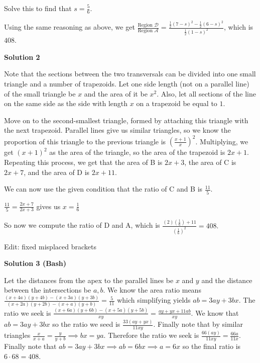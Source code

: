 \begin{enumerate}
 Solve this to find that $s = \frac{5}{6}$.

 Using the same reasoning as above, we get $\frac{\textrm{Region\ }\mathcal{D}}{\textrm{Region\ }\mathcal{A}} = \frac{\frac 12(7-s)^2 - \frac 12(6-s)^2}{\frac 12(1-s)^2}$, which is $\boxed{408}$.

 



\textbf{Solution 2}

Note that the sections between the two transversals can be divided into one small triangle and a number of trapezoids. Let one side length (not on a parallel line) of the small triangle be $x$ and the area of it be $x^2$. Also, let all sections of the line on the same side as the side with length $x$ on a trapezoid be equal to $1$. 

 Move on to the second-smallest triangle, formed by attaching this triangle with the next trapezoid. Parallel lines give us similar triangles, so we know the proportion of this triangle to the previous triangle is ${\left(\frac{x+1}{x}\right)}^2$. Multiplying, we get $(x+1)^2$ as the area of the triangle, so the area of the trapezoid is $2x+1$. Repeating this process, we get that the area of B is $2x+3$, the area of C is $2x+7$, and the area of D is $2x+11$.

 We can now use the given condition that the ratio of C and B is $\frac{11}{5}$.

 $\frac{11}{5} = \frac{2x+7}{2x+3}$ gives us $x = \frac{1}{6}$

 So now we compute the ratio of D and A, which is $\frac{(2)(\frac{1}{6}) + 11}{(\frac{1}{6})^2} = \boxed{408.}$

 Edit: fixed misplaced brackets

 



\textbf{Solution 3 (Bash)}

Let the distances from the apex to the parallel lines be $x$ and $y$ and the distance between the intersections be $a,b.$ We know the area ratio means $\frac{(x+4a)(y+4b)-(x+3a)(y+3b)}{(x+2a)(y+2b)-(x+a)(y+b)} =\frac{5}{11}$ which simplifying yields $ab = 3ay+3bx.$ The ratio we seek is $\frac{(x+6a)(y+6b)-(x+5a)(y+5b)}{xy} =\frac{ay+yx+11ab}{xy}.$ We know that $ab = 3ay+3bx$ so the ratio we seed is $\frac{33(ay+yx)}{11xy}.$ Finally note that by similar triangles $\frac{x}{x+a} =\frac{y}{y+b} \implies bx = ya.$ Therefore the ratio we seek is $\frac{66(ay)}{11xy} =\frac{66a}{11x}.$ Finally note that $ab=3ay+3bx \implies ab = 6bx \implies a = 6x$ so the final ratio is $6 \cdot 68 = \boxed{408}.$





\end{enumerate}
